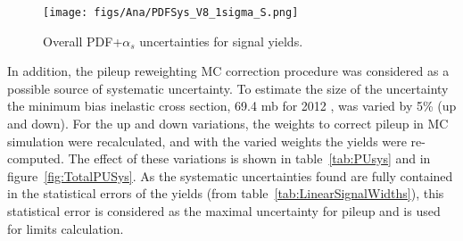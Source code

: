 \begin{table*}[htbH]
\begin{center}
\caption{PDF+$\alpha_{s}$ uncertainties for signal yields.\label{tab:PDFsys}}
\end{center}
\end{table*}

\begin{figure}[!Hhtbp]
  \begin{center}
    \texttt{[image: figs/Ana/PDFSys\_V8\_1sigma\_S.png]}
    \caption{Overall PDF+$\alpha_{s}$ uncertainties for signal yields.}
    \label{fig:TotalPDFSys}
  \end{center}
\end{figure}

In addition, the pileup reweighting MC correction procedure was considered as a possible source of systematic uncertainty. To estimate the size of the uncertainty the minimum bias inelastic cross section, 69.4 mb for 2012 , was varied by 5\% (up and down). For the up and down variations, the weights to correct pileup in MC simulation were recalculated, and with the varied weights the yields were re-computed. The effect of these variations is shown in table~\ref{tab:PUsys} and in figure~\ref{fig:TotalPUSys}. As the systematic uncertainties found are fully contained in the statistical errors of the yields (from table~\ref{tab:LinearSignalWidths}), this statistical error is considered as the maximal uncertainty for pileup and is used for limits calculation. %

